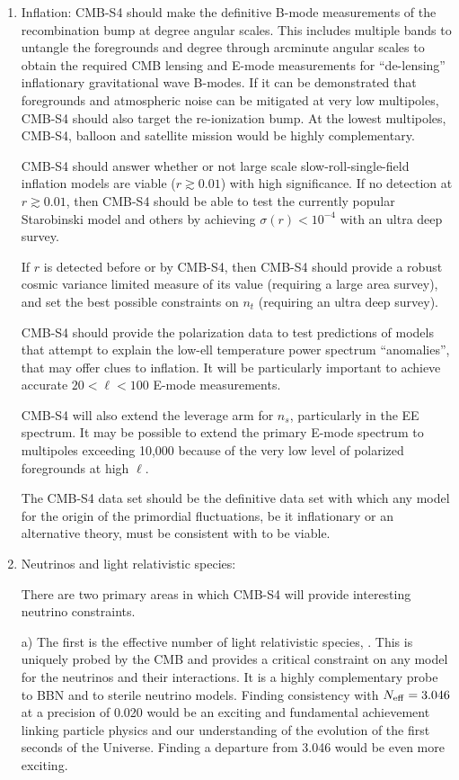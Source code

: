\begin{enumerate}

\item{Inflation:
CMB-S4 should make the definitive B-mode measurements of the recombination bump at degree angular scales. This includes multiple bands to untangle the foregrounds and degree through arcminute angular scales to obtain the required CMB lensing and E-mode measurements for ``de-lensing'' inflationary gravitational wave B-modes.  If it can be demonstrated that  foregrounds and atmospheric noise can be mitigated at very low multipoles, CMB-S4 should also target the re-ionization bump. At the lowest multipoles, CMB-S4, balloon and satellite mission would be highly complementary.

CMB-S4 should answer whether or not large scale slow-roll-single-field inflation models are viable ($r \gtrsim 0.01$) with high significance. If no detection at $r \gtrsim 0.01$, then CMB-S4 should be able to test the currently popular Starobinski model and others by achieving $\sigma(r) < 10^{-4}$ with an ultra deep survey.

If $r$ is detected before or by CMB-S4, then CMB-S4 should provide a robust cosmic variance limited measure of its value (requiring a large area survey), and set the best possible constraints on $n_t$ (requiring an ultra deep survey). 

CMB-S4 should provide the polarization data to test predictions of models that attempt to explain the low-ell temperature power spectrum ``anomalies'', that may offer clues to inflation. It will be particularly important to achieve accurate $20 < \ell < 100$ E-mode measurements.

 CMB-S4 will also extend the leverage arm for $n_s$, particularly in the EE spectrum. It may be possible to extend the primary E-mode spectrum to multipoles exceeding 10,000 because of the very low level of polarized foregrounds at high $\ell$. 

The CMB-S4 data set should be the definitive data set with which any model for the origin of the primordial fluctuations, be it inflationary or an alternative theory, must be consistent with to be viable.
}

\item{Neutrinos and light relativistic species:

There are two primary areas in which CMB-S4 will provide interesting neutrino constraints.


a) The first is the effective number of light relativistic species, \neff. This is uniquely probed by the CMB and provides a critical constraint on any model for the neutrinos and their interactions. It is a highly complementary probe to BBN and to sterile neutrino models.  Finding consistency with $N_\mathrm{eff} = 3.046$ at a precision of 0.020 would be an exciting and fundamental achievement linking particle physics and our understanding of the evolution of the first seconds of the Universe. Finding a departure from 3.046 would be even more exciting. %

}
\end{enumerate}
